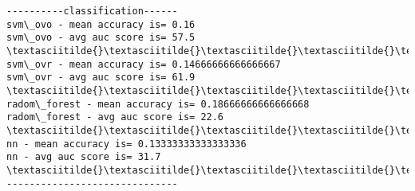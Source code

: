 \documentclass[11pt]{article}
\begin{document}
    \begin{Verbatim}[commandchars=\\\{\}]
----------classification------
svm\_ovo - mean accuracy is= 0.16
svm\_ovo - avg auc score is= 57.5
\textasciitilde{}\textasciitilde{}\textasciitilde{}\textasciitilde{}\textasciitilde{}\textasciitilde{}\textasciitilde{}\textasciitilde{}\textasciitilde{}\textasciitilde{}\textasciitilde{}\textasciitilde{}\textasciitilde{}\textasciitilde{}\textasciitilde{}\textasciitilde{}\textasciitilde{}\textasciitilde{}\textasciitilde{}\textasciitilde{}\textasciitilde{}\textasciitilde{}\textasciitilde{}\textasciitilde{}\textasciitilde{}\textasciitilde{}\textasciitilde{}\textasciitilde{}\textasciitilde{}
svm\_ovr - mean accuracy is= 0.14666666666666667
svm\_ovr - avg auc score is= 61.9
\textasciitilde{}\textasciitilde{}\textasciitilde{}\textasciitilde{}\textasciitilde{}\textasciitilde{}\textasciitilde{}\textasciitilde{}\textasciitilde{}\textasciitilde{}\textasciitilde{}\textasciitilde{}\textasciitilde{}\textasciitilde{}\textasciitilde{}\textasciitilde{}\textasciitilde{}\textasciitilde{}\textasciitilde{}\textasciitilde{}\textasciitilde{}\textasciitilde{}\textasciitilde{}\textasciitilde{}\textasciitilde{}\textasciitilde{}\textasciitilde{}\textasciitilde{}\textasciitilde{}
radom\_forest - mean accuracy is= 0.18666666666666668
radom\_forest - avg auc score is= 22.6
\textasciitilde{}\textasciitilde{}\textasciitilde{}\textasciitilde{}\textasciitilde{}\textasciitilde{}\textasciitilde{}\textasciitilde{}\textasciitilde{}\textasciitilde{}\textasciitilde{}\textasciitilde{}\textasciitilde{}\textasciitilde{}\textasciitilde{}\textasciitilde{}\textasciitilde{}\textasciitilde{}\textasciitilde{}\textasciitilde{}\textasciitilde{}\textasciitilde{}\textasciitilde{}\textasciitilde{}\textasciitilde{}\textasciitilde{}\textasciitilde{}\textasciitilde{}\textasciitilde{}
nn - mean accuracy is= 0.13333333333333336
nn - avg auc score is= 31.7
\textasciitilde{}\textasciitilde{}\textasciitilde{}\textasciitilde{}\textasciitilde{}\textasciitilde{}\textasciitilde{}\textasciitilde{}\textasciitilde{}\textasciitilde{}\textasciitilde{}\textasciitilde{}\textasciitilde{}\textasciitilde{}\textasciitilde{}\textasciitilde{}\textasciitilde{}\textasciitilde{}\textasciitilde{}\textasciitilde{}\textasciitilde{}\textasciitilde{}\textasciitilde{}\textasciitilde{}\textasciitilde{}\textasciitilde{}\textasciitilde{}\textasciitilde{}\textasciitilde{}
------------------------------

    \end{Verbatim}
\end{document}
